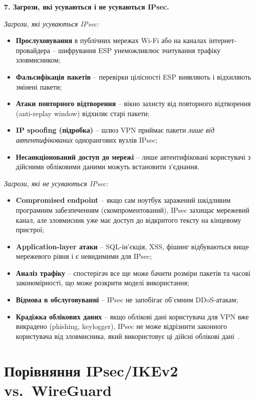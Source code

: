 \textbf{7. Загрози, які усуваються і не усуваються IPsec.}

\textit{Загрози, які усуваються IPsec:}
\begin{itemize}
    \item \textbf{Прослуховування} в публічних мережах Wi-Fi або на каналах інтернет-провайдера -- шифрування 
        ESP унеможливлює зчитування трафіку зловмисником;
    \item \textbf{Фальсифікація пакетів} -- перевірки цілісності ESP виявляють і відхиляють змінені пакети;
    \item \textbf{Атаки повторного відтворення} -- вікно захисту від повторного відтворення (anti-replay window) 
        відхиляє старі пакети;
    \item \textbf{IP spoofing (підробка)} -- шлюз VPN приймає пакети \textit{лише від автентифікованих} однорангових 
        вузлів IPsec;
    \item \textbf{Несанкціонований доступ до мережі} -- лише автентифіковані користувачі з дійсними обліковими 
        даними можуть встановити з'єднання.
\end{itemize}

\textit{Загрози, які не усуваються IPsec:}
\begin{itemize}
    \item \textbf{Compromised endpoint} -- якщо сам ноутбук заражений шкідливим програмним забезпеченням 
        (скомпроментований), IPsec захищає мережевий канал, але зловмисник уже має доступ до відкритого тексту на 
        кінцевому пристрої;
    \item \textbf{Application-layer атаки} -- SQL-ін'єкція, XSS, фішинг відбуваються вище мережевого рівня і є 
        невидимими для IPsec;
    \item \textbf{Аналіз трафіку} -- спостерігач все ще може бачити розміри пакетів та часові закономірності, 
        що може розкрити моделі використання;
    \item \textbf{Відмова в обслуговуванні} -- IPsec не запобігає об’ємним DDoS-атакам;
    \item \textbf{Крадіжка облікових даних} -- якщо облікові дані користувача для VPN вже викрадено (phishing, 
        keylogger), IPsec не може відрізнити законного користувача від зловмисника, який використовує ці дійсні 
        облікові дані~\cite{nist_sp800_77r1}.
\end{itemize}

\section{Порівняння IPsec/IKEv2 vs.\ WireGuard}
\label{sec:task4}

